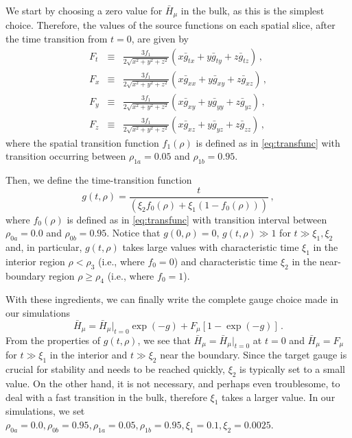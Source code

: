 \documentclass[aps,letterpaper,twocolumn,nofootinbib]{revtex4}
\numberwithin{equation}{section}
\begin{document}
We start by choosing a zero value for $\bar{H}_\mu$ in the bulk, as this is the simplest choice. Therefore, the values of the source functions on each spatial slice, after the time transition from $t=0$, are given by
\begin{eqnarray}
\label{eqn:extend_gauge_txyz}
F_t&\equiv&\frac{3f_1}{2\sqrt{x^2+y^2+z^2}}(x \bar{g}_{tx}+y\bar{g}_{ty}+z\bar{g}_{tz})\,, \nonumber \\
F_x&\equiv&\frac{3f_1}{2\sqrt{x^2+y^2+z^2}}(x \bar{g}_{xx}+y\bar{g}_{xy}+z\bar{g}_{xz})\,, \nonumber \\
F_y&\equiv&\frac{3f_1}{2\sqrt{x^2+y^2+z^2}}(x \bar{g}_{xy}+y\bar{g}_{yy}+z\bar{g}_{yz})\,, \nonumber \\
F_z&\equiv&\frac{3f_1}{2\sqrt{x^2+y^2+z^2}}(x \bar{g}_{xz}+y\bar{g}_{yz}+z\bar{g}_{zz})\,,
\end{eqnarray}
where the spatial transition function $f_1(\rho)$ is defined as in \eqref{eq:transfunc} with transition occurring between $\rho_{1a}=0.05$ and $\rho_{1b}=0.95$.

Then, we define the time-transition function
\begin{equation}
g(t,\rho)=\frac{t}{(\xi_2 f_0(\rho)+\xi_1(1-f_0(\rho)))}\,,
\end{equation}
where $f_0(\rho)$ is defined as in \eqref{eq:transfunc} with transition interval between $\rho_{0a}=0.0$ and $\rho_{0b}=0.95$. Notice that $g(0,\rho)=0$, $g(t,\rho)\gg 1$ for $t\gg\xi_1,\xi_2$ and, in particular, $g(t,\rho)$ takes large values with characteristic time $\xi_1$ in the interior region $\rho<\rho_3$ (i.e., where $f_0=0$) and characteristic time $\xi_2$ in the near-boundary region $\rho\geq\rho_4$ (i.e., where $f_0=1$).

With these ingredients, we can finally write the complete gauge choice made in our simulations
\begin{equation}
\bar{H}_\mu=\bar{H}_{\mu}\big|_{t=0}\exp(-g)+F_\mu[1- \exp(-g)]\,.
\end{equation}
From the properties of $g(t,\rho)$, we see that $\bar{H}_\mu=\bar{H}_{\mu}|_{t=0}$ at $t=0$ and $\bar{H}_\mu=F_\mu$ for $t\gg\xi_1$ in the interior and $t\gg\xi_2$ near the boundary. Since the target gauge is crucial for stability and needs to be reached quickly, $\xi_2$ is typically set to a small value. On the other hand, it is not necessary, and perhaps even troublesome, to deal with a fast transition in the bulk, therefore $\xi_1$ takes a larger value. In our simulations, we set $\rho_{0a}=0.0,\rho_{0b}=0.95,\rho_{1a}=0.05,\rho_{1b}=0.95,\xi_1=0.1,\xi_2=0.0025$.
\end{document}
